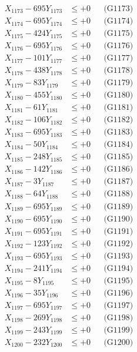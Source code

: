\documentclass[a4paper,10pt]{article}
\begin{document}
{\begin{align}
X_{1173} - 695Y_{1173} &\leq +0 && \text{(G1173)} \\
X_{1174} - 695Y_{1174} &\leq +0 && \text{(G1174)} \\
X_{1175} - 424Y_{1175} &\leq +0 && \text{(G1175)} \\
X_{1176} - 695Y_{1176} &\leq +0 && \text{(G1176)} \\
X_{1177} - 101Y_{1177} &\leq +0 && \text{(G1177)} \\
X_{1178} - 438Y_{1178} &\leq +0 && \text{(G1178)} \\
X_{1179} - 83Y_{1179} &\leq +0 && \text{(G1179)} \\
X_{1180} - 455Y_{1180} &\leq +0 && \text{(G1180)} \\
\allowbreak
X_{1181} - 61Y_{1181} &\leq +0 && \text{(G1181)} \\
X_{1182} - 106Y_{1182} &\leq +0 && \text{(G1182)} \\
X_{1183} - 695Y_{1183} &\leq +0 && \text{(G1183)} \\
X_{1184} - 50Y_{1184} &\leq +0 && \text{(G1184)} \\
X_{1185} - 248Y_{1185} &\leq +0 && \text{(G1185)} \\
X_{1186} - 142Y_{1186} &\leq +0 && \text{(G1186)} \\
X_{1187} - 3Y_{1187} &\leq +0 && \text{(G1187)} \\
X_{1188} - 64Y_{1188} &\leq +0 && \text{(G1188)} \\
X_{1189} - 695Y_{1189} &\leq +0 && \text{(G1189)} \\
X_{1190} - 695Y_{1190} &\leq +0 && \text{(G1190)} \\
\allowbreak
X_{1191} - 695Y_{1191} &\leq +0 && \text{(G1191)} \\
X_{1192} - 123Y_{1192} &\leq +0 && \text{(G1192)} \\
X_{1193} - 695Y_{1193} &\leq +0 && \text{(G1193)} \\
X_{1194} - 241Y_{1194} &\leq +0 && \text{(G1194)} \\
X_{1195} - 8Y_{1195} &\leq +0 && \text{(G1195)} \\
X_{1196} - 35Y_{1196} &\leq +0 && \text{(G1196)} \\
X_{1197} - 695Y_{1197} &\leq +0 && \text{(G1197)} \\
X_{1198} - 269Y_{1198} &\leq +0 && \text{(G1198)} \\
X_{1199} - 243Y_{1199} &\leq +0 && \text{(G1199)} \\
X_{1200} - 232Y_{1200} &\leq +0 && \text{(G1200)} \\

\end{align}}
\end{document}
